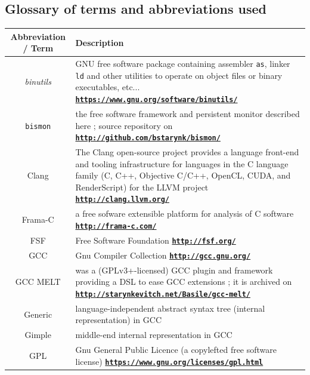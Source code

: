 \documentclass[11pt,a4paper,svgnames]{article}
\newcommand{\bmurl}[1]{{\href{#1}{\texttt{\textbf{#1}}}}}
\begin{document}
\newpage


\subsection*{Glossary of terms and abbreviations used}

\smallskip

\begin{tabular}{|c|p{}|}
  \hline
  \begin{minipage}{0.15\textwidth}

    \smallskip
    
    \textbf{Abbreviation / Term}

    \smallskip
    
  \end{minipage} & \textbf{Description} \\
  \hline \emph{binutils} & GNU free software package containing assembler \texttt{as}, linker \texttt{ld} and other utilities to operate on object files or binary executables, etc... \bmurl{https://www.gnu.org/software/binutils/} \\
  \hline \texttt{bismon} & the free software framework and persistent monitor described here ; source repository on \bmurl{http://github.com/bstarynk/bismon/} \\
  \hline Clang & The Clang open-source project provides a language front-end and tooling infrastructure for languages in the C language family (C, C++, Objective C/C++, OpenCL, CUDA, and RenderScript) for the LLVM project \bmurl{http://clang.llvm.org/} \\
  \hline Frama-C &  a free sofware extensible platform for analysis of C software \bmurl{http://frama-c.com/} \\
  \hline FSF & Free Software Foundation \bmurl{http://fsf.org/} \\
  \hline GCC & Gnu Compiler Collection \bmurl{http://gcc.gnu.org/} \\
  \hline GCC MELT & was a (GPLv3+-licensed) GCC plugin and framework providing a DSL to ease GCC extensions ; it is archived on \bmurl{http://starynkevitch.net/Basile/gcc-melt/}\\
  \hline Generic & language-independent abstract syntax tree (internal representation) in GCC \\
  \hline Gimple & middle-end internal representation in GCC \\
  \hline GPL & Gnu General Public Licence (a copylefted free software license) \bmurl{https://www.gnu.org/licenses/gpl.html} \\

\end{tabular}
\end{document}
